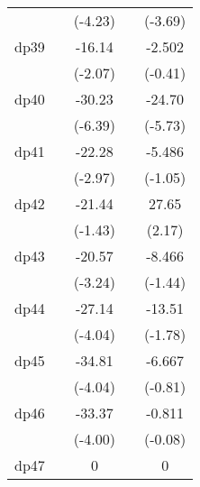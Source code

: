 {\begin{tabular}{l*{4}{c}}
            &                     &     (-4.23)         &                     &     (-3.69)         \\
[1em]
dp39        &                     &      -16.14\sym{*}  &                     &      -2.502         \\
            &                     &     (-2.07)         &                     &     (-0.41)         \\
[1em]
dp40        &                     &      -30.23\sym{***}&                     &      -24.70\sym{***}\\
            &                     &     (-6.39)         &                     &     (-5.73)         \\
[1em]
dp41        &                     &      -22.28\sym{**} &                     &      -5.486         \\
            &                     &     (-2.97)         &                     &     (-1.05)         \\
[1em]
dp42        &                     &      -21.44         &                     &       27.65\sym{*}  \\
            &                     &     (-1.43)         &                     &      (2.17)         \\
[1em]
dp43        &                     &      -20.57\sym{**} &                     &      -8.466         \\
            &                     &     (-3.24)         &                     &     (-1.44)         \\
[1em]
dp44        &                     &      -27.14\sym{***}&                     &      -13.51         \\
            &                     &     (-4.04)         &                     &     (-1.78)         \\
[1em]
dp45        &                     &      -34.81\sym{***}&                     &      -6.667         \\
            &                     &     (-4.04)         &                     &     (-0.81)         \\
[1em]
dp46        &                     &      -33.37\sym{***}&                     &      -0.811         \\
            &                     &     (-4.00)         &                     &     (-0.08)         \\
[1em]
dp47        &                     &           0         &                     &           0         \\

\end{tabular}}
